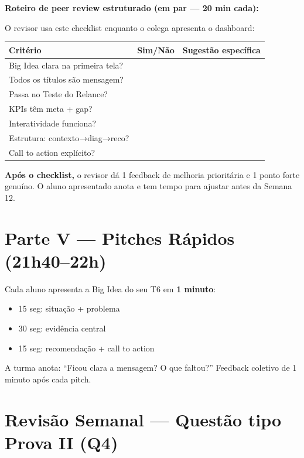 \begin{BoardBox}
\textbf{Roteiro de peer review estruturado (em par — 20 min cada):}

O revisor usa este checklist enquanto o colega apresenta o dashboard:

\begin{tabular}{|p{5cm}|l|p{5.5cm}|}
\hline
\textbf{Critério} & \textbf{Sim/Não} & \textbf{Sugestão específica} \\
\hline
Big Idea clara na primeira tela? & & \\
Todos os títulos são mensagem? & & \\
Passa no Teste do Relance? & & \\
KPIs têm meta + gap? & & \\
Interatividade funciona? & & \\
Estrutura: contexto→diag→reco? & & \\
Call to action explícito? & & \\
\hline
\end{tabular}

\textbf{Após o checklist,} o revisor dá 1 feedback de melhoria prioritária
e 1 ponto forte genuíno. O aluno apresentado anota e tem tempo para ajustar
antes da Semana 12.
\end{BoardBox}

\section{Parte V — Pitches Rápidos (21h40–22h)}

\begin{SolvedBox}
Cada aluno apresenta a Big Idea do seu T6 em \textbf{1 minuto}:
\begin{itemize}
  \item 15 seg: situação + problema
  \item 30 seg: evidência central
  \item 15 seg: recomendação + call to action
\end{itemize}

A turma anota: ``Ficou clara a mensagem? O que faltou?''
Feedback coletivo de 1 minuto após cada pitch.
\end{SolvedBox}

\section{Revisão Semanal — Questão tipo Prova II (Q4)}

